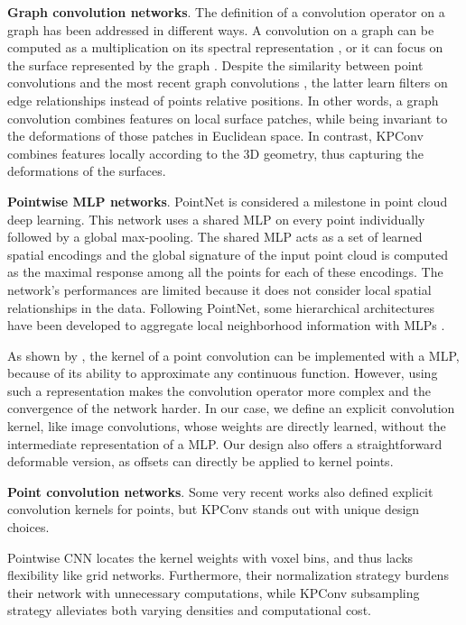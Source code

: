 \documentclass[10pt,twocolumn,letterpaper]{article}
\begin{document}
\noindent
\textbf{Graph convolution networks}. The definition of a convolution operator on a graph has been addressed in different ways. A convolution on a graph can be computed as a multiplication on its spectral representation \cite{defferrard2016convolutional, yi2017syncspeccnn}, or it can focus on the surface represented by the graph \cite{masci2015geodesic, bronstein2017geometric, simonovsky2017dynamic, monti2017geometric}. Despite the similarity between point convolutions and the most recent graph convolutions \cite{verma2018feastnet, wang2018dynamic}, the latter learn filters on edge relationships instead of points relative positions. In other words, a graph convolution combines features on local surface patches, while being invariant to the deformations of those patches in Euclidean space. In contrast, KPConv combines features locally according to the 3D geometry, thus capturing the deformations of the surfaces.

\noindent
\textbf{Pointwise MLP networks}. PointNet \cite{qi2017pointnet} is considered a milestone in point cloud deep learning. This network uses a shared MLP on every point individually followed by a global max-pooling. The shared MLP acts as a set of learned spatial encodings and the global signature of the input point cloud is computed as the maximal response among all the points for each of these encodings. The network's performances are limited because it does not consider local spatial relationships in the data. Following PointNet, some hierarchical architectures have been developed to aggregate local neighborhood information with MLPs \cite{qi2017pointnet++, li2018so, liu2018point2sequence}.

As shown by \cite{wang2018deep, li2018pointcnn, hermosilla2018monte}, the kernel of a point convolution can be implemented with a MLP, because of its ability to approximate any continuous function. However, using such a representation makes the convolution operator more complex and the convergence of the network harder. In our case, we define an explicit convolution kernel, like image convolutions, whose weights are directly learned, without the intermediate representation of a MLP. Our design also offers a straightforward deformable version, as offsets can directly be applied to kernel points.

\noindent
\textbf{Point convolution networks}. Some very recent works also defined explicit convolution kernels for points, but KPConv stands out with unique design choices.

Pointwise CNN \cite{hua2018pointwise} locates the kernel weights with voxel bins, and thus lacks flexibility like grid networks. Furthermore, their normalization strategy burdens their network with unnecessary computations, while KPConv subsampling strategy alleviates both varying densities and computational cost.
\end{document}
